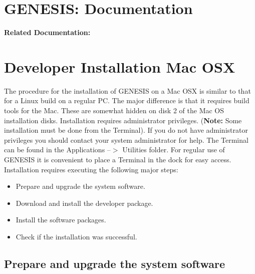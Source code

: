 \documentclass[12pt]{article}
\begin{document}
\section*{GENESIS: Documentation}

{\bf Related Documentation:}

\section*{Developer Installation Mac OSX}

The procedure for the installation of GENESIS on a Mac OSX is similar to that for a Linux build on a regular PC. The major difference is that it requires build tools for the Mac. These are somewhat hidden on disk 2 of the Mac OS installation disks. Installation requires administrator privileges. ({\bf Note:} Some installation must be done from the Terminal). If you do not have administrator privileges you should contact your system administrator for help. The Terminal can be found in the Applications --$>$ Utilities folder. For regular use of GENESIS it is convenient to place a Terminal in the dock for easy access.
Installation requires executing the following major steps:
\begin{itemize}
   \item[] Prepare and upgrade the system software.
   \item[] Download and install the developer package.
   \item[] Install the software packages.
   \item[] Check if the installation was successful. 
\end{itemize}

\subsection*{Prepare and upgrade the system software}
\end{document}
